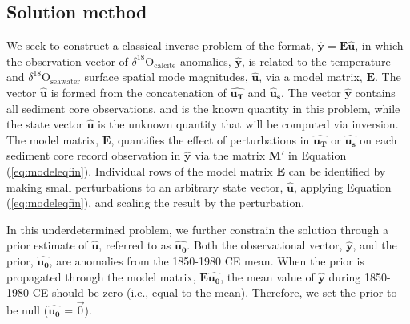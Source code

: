 \documentclass[draft]{agujournal2019}
\begin{document}
\subsection{Solution method \label{sec:solution}}
We seek to construct a classical inverse problem of the format,
$\mathbf{\hat{y}} = \mathbf{E\hat{u}}$, in which the observation
vector of $\delta^{18}\mathrm{O}_{\mathrm{calcite}}$ anomalies,
$\mathbf{\hat{y}}$, is related to the temperature and
$\delta^{18}\mathrm{O}_{\mathrm{seawater}}$ surface spatial mode
magnitudes, $\mathbf{\hat{u}}$, via a model matrix, $\mathbf{E}$. The
vector $\mathbf{\hat{u}}$ is formed from the concatenation of
$\mathbf{\hat{u_{T}}}$ and $\mathbf{\hat{u}_{s}}$. The vector
$\mathbf{\hat{y}}$ contains all sediment core observations, and is the
known quantity in this problem, while the state vector
$\mathbf{\hat{u}}$ is the unknown quantity that will be computed via
inversion. The model matrix, $\mathbf{E}$, quantifies the effect of
perturbations in $\mathbf{\hat{u_{T}}}$ or $\mathbf{\hat{u_{s}}}$ on
each sediment core record observation in $\mathbf{\hat{y}}$ via the
matrix $\mathbf{M'}$ in Equation (\ref{eq:modeleqfin}). Individual
rows of the model matrix $\mathbf{E}$ can be identified by making
small perturbations to an arbitrary state vector, $\mathbf{\hat{u}}$,
applying Equation (\ref{eq:modeleqfin}), and scaling the result by the
perturbation.

In this underdetermined problem, we further constrain the solution
through a prior estimate of $\mathbf{\hat{u}}$, referred to as
$\mathbf{\hat{u_{0}}}$. Both the observational vector,
$\mathbf{\hat{y}}$, and the prior, $\mathbf{\hat{u_{0}}}$, are
anomalies from the 1850-1980 CE mean. When the prior is propagated
through the model matrix, $\mathbf{E\hat{u_{0}}}$, the mean value of
$\mathbf{\hat{y}}$ during 1850-1980 CE should be zero (i.e., equal to the
mean). Therefore, we set the prior to be null ($\mathbf{\hat{u_0}}$ =
$\vec{0}$).
\end{document}

